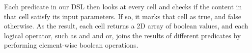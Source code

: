 Each predicate in our DSL then looks at every cell and checks if the content in that cell satisfy its input parameters.
If so, it marks that cell as true, and false otherwise.
As the result, each cell returns a 2D array of boolean values, and each logical operator, such as and and or, joins the results of different predicates by performing element-wise boolean operations.







